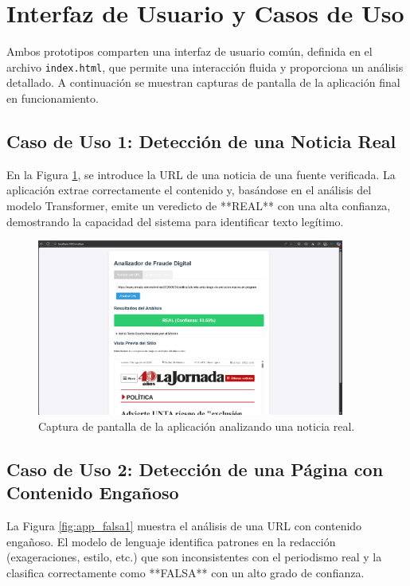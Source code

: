 \section{Interfaz de Usuario y Casos de Uso}
Ambos prototipos comparten una interfaz de usuario común, definida en el archivo \texttt{index.html}, que permite una interacción fluida y proporciona un análisis detallado. A continuación se muestran capturas de pantalla de la aplicación final en funcionamiento.

\subsection{Caso de Uso 1: Detección de una Noticia Real}
En la Figura \ref{fig:app_real}, se introduce la URL de una noticia de una fuente verificada. La aplicación extrae correctamente el contenido y, basándose en el análisis del modelo Transformer, emite un veredicto de **REAL** con una alta confianza, demostrando la capacidad del sistema para identificar texto legítimo.

\begin{figure}[htbp]
    \centering
    \includegraphics[width=0.9\textwidth]{Imagenes/app_real.png} %
    \caption{Captura de pantalla de la aplicación analizando una noticia real.}
    \label{fig:app_real}
\end{figure}

\subsection{Caso de Uso 2: Detección de una Página con Contenido Engañoso}
La Figura \ref{fig:app_falsa1} muestra el análisis de una URL con contenido engañoso. El modelo de lenguaje identifica patrones en la redacción (exageraciones, estilo, etc.) que son inconsistentes con el periodismo real y la clasifica correctamente como **FALSA** con un alto grado de confianza.

